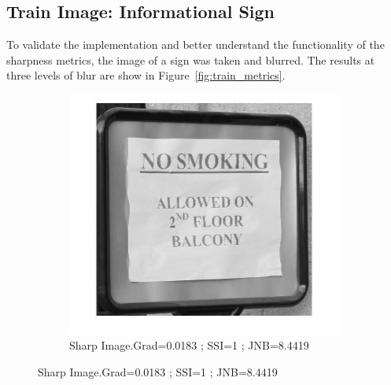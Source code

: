 \subsection{Train Image: Informational Sign}
To validate the implementation and better understand the functionality of the sharpness metrics, the image of a sign was taken and blurred. The results at three levels of blur are show in Figure~\ref{fig:train_metrics}.

\begin{figure}
        \centering
        \begin{subfigure}[b]{0.3\textwidth}
                \centering
                \includegraphics[width=\textwidth]{true.jpg}
                \caption{Sharp Image.\newline Grad=0.0183 ; SSI=1 ; JNB=8.4419}
               

\end{subfigure}
\end{figure}
